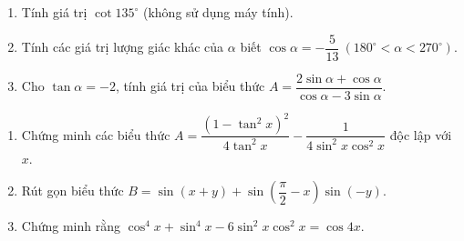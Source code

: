\begin{ex}[4,0 điểm]%
	\begin{enumerate}
		\item Tính giá trị $\cot 135^{\circ}$ (không sử dụng máy tính).
		\item Tính các giá trị lượng giác khác của $\alpha$ biết $\cos\alpha=-\dfrac{5}{13}\ (180^{\circ}<\alpha<270^{\circ})$.
		\item Cho $\tan\alpha = -2$, tính giá trị của biểu thức $A=\dfrac{2\sin\alpha+\cos\alpha}{\cos\alpha-3\sin\alpha}$.
	\end{enumerate}
\end{ex}
\begin{ex}[4,0 điểm]%
	\begin{enumerate}
		\item Chứng minh các biểu thức $A=\dfrac{(1-\tan^{2}x)^{2}}{4\tan^{2}x}-\dfrac{1}{4\sin^{2}x\cos^{2}x}$ độc lập với $x$.
		\item Rút gọn biểu thức $B=\sin(x+y)+\sin(\dfrac{\pi}{2}-x)\sin(-y)$.
		\item Chứng minh rằng $\cos^{4}x+\sin^{4}x-6\sin^{2}x\cos^{2}x=\cos 4x$.
	\end{enumerate}
\end{ex}
